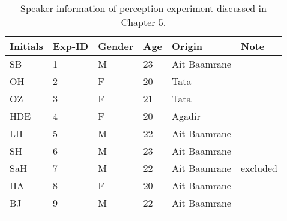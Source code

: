 \begin{table} 
\caption{Speaker information of perception experiment discussed in Chapter 5.}
\label{Table A3}
\begin{tabular}{llllll}
\lsptoprule
\textbf{Initials}                        & \textbf{Exp-ID} & \textbf{Gender} & \textbf{Age} & \textbf{Origin}       & \textbf{Note}     \\
\midrule
SB                              & 1      & M      & 23  & Ait Baamrane &          \\
OH                              & 2      & F      & 20  & Tata         &          \\
OZ                              & 3      & F      & 21  & Tata         &          \\
HDE                             & 4      & F      & 20  & Agadir       &          \\
LH                              & 5      & M      & 22  & Ait Baamrane &          \\
SH                              & 6      & M      & 23  & Ait Baamrane &          \\
SaH                             & 7      & M      & 22  & Ait Baamrane & excluded \\
HA                              & 8      & F      & 20  & Ait Baamrane &          \\
BJ                              & 9      & M      & 22  & Ait Baamrane &         \\
\lspbottomrule
\end{tabular}
\end{table}